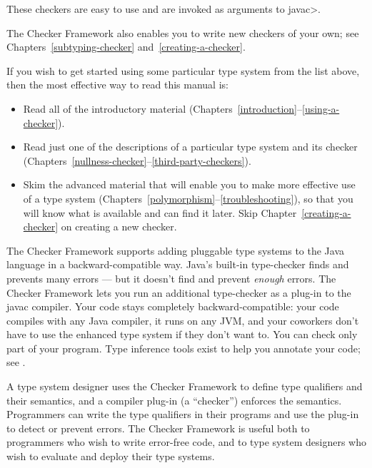 \begin{enumerate}
\end{enumerate}

\noindent
These checkers are easy to use and are invoked as arguments to \<javac>.


The Checker Framework also enables you to write new checkers of your
own; see Chapters~\ref{subtyping-checker} and~\ref{creating-a-checker}.



If you wish to get started using some particular type system from the list
above, then the most effective way to read this manual is:

\begin{itemize}
\item
  Read all of the introductory material
  (Chapters~\ref{introduction}--\ref{using-a-checker}).
\item
  Read just one of the descriptions of a particular type system and its
  checker (Chapters~\ref{nullness-checker}--\ref{third-party-checkers}).
\item
  Skim the advanced material that will enable you to make more effective
  use of a type system
  (Chapters~\ref{polymorphism}--\ref{troubleshooting}), so that you will
  know what is available and can find it later.  Skip
  Chapter~\ref{creating-a-checker} on creating a new checker.
\end{itemize}



The Checker Framework supports adding
pluggable type systems to the Java language in a backward-compatible way.
Java's built-in type-checker finds and prevents many errors --- but it
doesn't find and prevent \emph{enough} errors.  The Checker Framework lets you
run an additional type-checker as a plug-in to the javac compiler.  Your
code stays completely backward-compatible:  your code compiles with any
Java compiler, it runs on any JVM, and your coworkers don't have to use the
enhanced type system if they don't want to.  You can check only part of
your program.  Type inference tools exist to help you annotate your
code; see .


A type system designer uses the Checker Framework to define type qualifiers
and their semantics, and a
compiler plug-in (a ``checker'') enforces the semantics.  Programmers can
write the type qualifiers in their programs and use the plug-in to detect
or prevent errors.  The Checker Framework is useful both to programmers who
wish to write error-free code, and to type system designers who wish to
evaluate and deploy their type systems.



